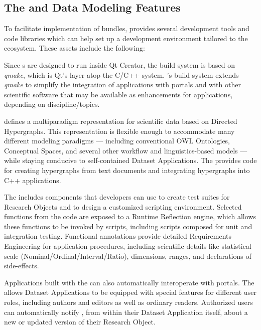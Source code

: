 \documentclass[11pt,letterpaper]{article}
\begin{document}
\vspace{-.1em}
\subsection{The {\lMOSAIC} {\lSDK} and Data Modeling Features}
\vspace{.1em}
To facilitate implementation of {\RAK} bundles, 
{\MOSAIC} provides several development tools and 
code libraries which can help set up a development 
environment tailored to the {\MOSAIC} ecosystem.  
These assets include the following: 

\begin{description}[labelsep=.6em,itemsep=.6em]
\item[\slead{Build Tools}]  Since {\RAK}s are designed to 
run inside Qt Creator, the {\RAK} build system 
is based on \textit{qmake}, which is Qt's 
layer atop the C/C++  system.  
{\lfMOSAIC}'s build system extends \textit{qmake} to 
simplify the integration of {\RAK} applications 
with {\MOSAIC} portals and with other scientific 
software that may be available as enhancements 
for {\RAK} applications, depending on  
discipline/topics.
\item[\slead{Hypergraph Code Libraries and Parsers}]  
{\lfMOSAIC} defines a multiparadigm representation for 
scientific data based on Directed Hypergraphs.  
This representation is flexible enough to 
accommodate many different modeling 
paradigms --- including 
conventional OWL Ontologies, 
Conceptual Spaces, and 
several other workflow and linguistics-based models 
--- while staying conducive to self-contained 
Dataset Applications.  The {\MOSAIC} {\SDK} provides 
code for creating hypergraphs from text documents and 
integrating hypergraphs into C++ applications.
\item[\slead{Scripting and Testing}]  The {\MOSAIC} {\SDK} includes 
components that developers can use to create 
test suites for Research Objects and to design a 
customized scripting environment.  Selected 
functions from the {\RO} code are exposed 
to a Runtime Reflection engine, which allows these 
functions to be invoked by scripts, including 
scripts composed for unit and integration testing.  
Functional annotations provide detailed Requirements 
Engineering for application procedures, including scientific 
details like statistical scale (Nominal/Ordinal/Interval/Ratio),
dimensions, ranges, and declarations of side-effects.
\item[\slead{{\lMOSAIC} Interop}]  Applications built 
with the {\MOSAIC} {\SDK} can also automatically 
interoperate with {\MOSAIC} portals.  The {\SDK} 
allows Dataset Applications to be equipped 
with special features for different user roles, 
including authors and editors as well as ordinary readers.  
Authorized 
users can automatically notify {\MOSAIC}, 
from within their Dataset Application itself, about 
a new or updated version of their Research Object.
\end{description}
\end{document}
